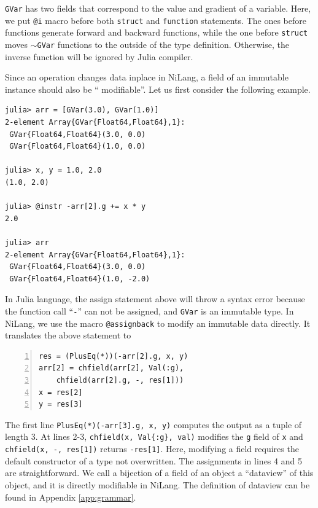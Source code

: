 \documentclass{article}
\newcommand{\<}{\langle}
\renewcommand{\>}{\rangle}
\newcommand{\App}[1]{Appendix \ref{#1}}
\theoremstyle{definition}\newtheorem{definition}{\textit{Definition}}
\begin{document}
\texttt{GVar} has two fields that correspond to the value and gradient of a variable.
Here, we put \texttt{@i} macro before both \texttt{struct} and \texttt{function} statements.
The ones before functions generate forward and backward functions, while the one before \texttt{struct} moves \texttt{$\sim$GVar} functions to the outside of the type definition. Otherwise, the inverse function will be ignored by Julia compiler.

Since an operation changes data inplace in NiLang, a field of an immutable instance should also be `` modifiable''.
Let us first consider the following example.

\begin{minipage}{.88\columnwidth}
\begin{lstlisting}
julia> arr = [GVar(3.0), GVar(1.0)]
2-element Array{GVar{Float64,Float64},1}:
 GVar{Float64,Float64}(3.0, 0.0)
 GVar{Float64,Float64}(1.0, 0.0)

julia> x, y = 1.0, 2.0
(1.0, 2.0)

julia> @instr -arr[2].g += x * y
2.0

julia> arr
2-element Array{GVar{Float64,Float64},1}:
 GVar{Float64,Float64}(3.0, 0.0) 
 GVar{Float64,Float64}(1.0, -2.0)
\end{lstlisting}
\end{minipage}

In Julia language, the assign statement above will throw a syntax error because the function call ``\texttt{-}'' can not be assigned, and \texttt{GVar} is an immutable type.
In NiLang, we use the macro \texttt{@assignback} to modify an immutable data directly. It translates the above statement to

\begin{minipage}{.88\columnwidth}
\begin{lstlisting}[numberstyle=\scriptsize\color{gray},numbers=left,numbersep=8pt]
res = (PlusEq(*))(-arr[2].g, x, y)
arr[2] = chfield(arr[2], Val(:g),
    chfield(arr[2].g, -, res[1]))
x = res[2]
y = res[3]
\end{lstlisting}
\end{minipage}

The first line \texttt{PlusEq(*)(-arr[3].g, x, y)} computes the output as a tuple of length $3$.
At lines 2-3, \texttt{chfield(x, Val\{:g\}, val)} modifies the \texttt{g} field of \texttt{x} and \texttt{chfield(x, -, res[1])} returns \texttt{-res[1]}. Here, modifying a field requires the default constructor of a type not overwritten.
The assignments in lines 4 and 5 are straightforward.
We call a bijection of a field of an object a ``dataview'' of this object, and it is directly modifiable in NiLang.
The definition of dataview can be found in \App{app:grammar}.
\end{document}
